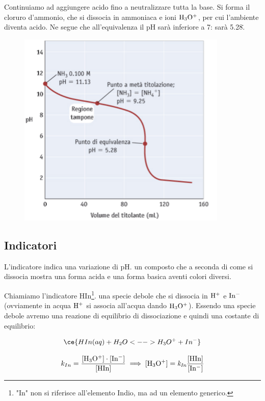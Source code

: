 Continuiamo ad aggiungere acido fino a neutralizzare tutta la base. Si forma il cloruro d'ammonio, che si dissocia in ammoniaca e ioni $\rm H_3O^+$, per cui l'ambiente diventa acido. Ne segue che all'equivalenza il pH sarà inferiore a 7: sarà 5.28\..

\begin{figure}[H]
    \centering
    \includegraphics[width=10cm]{immagini/titolazione_base_debole_acido_forte.png}
\end{figure}

\subsection{Indicatori}
L'indicatore indica una variazione di pH. \E un composto che a seconda di come si dissocia mostra una forma acida e una forma basica aventi colori diversi.

Chiamiamo l'indicatore HIn\footnote{"In" non si riferisce all'elemento Indio, ma ad un elemento generico.}. \E una specie debole che si dissocia in $\rm H^+$ e $\rm In^-$ (ovviamente in acqua $\rm H^+$ si associa all'acqua dando $\rm H_3O^+$). Essendo una specie debole avremo una reazione di equilibrio di dissociazione e quindi una costante di equilibrio:

$$\ce{HIn(aq) + H_2O <--> H_3O^+ + In^-}$$

$$k_{In}=\frac{\rm{[H_3O^+]} \cdot \rm{[In^-]}}{\rm{[HIn]}}\implies \rm{[H_3O^+]}=\textit{k}_{\textit{In}} \frac{\rm{[HIn]}}{\rm{[In^-]}}$$


